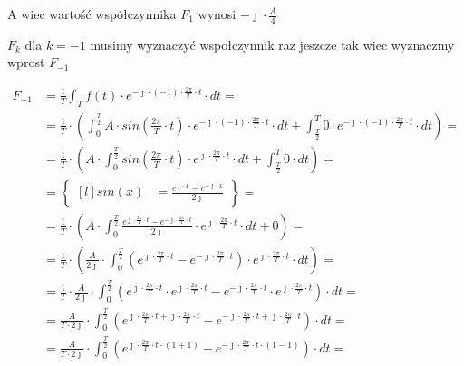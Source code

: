 \begin{task}
A wiec wartość współczynnika $F_1$ wynosi $-\jmath \cdot \frac{A}{4}$

$F_k$ dla $k=-1$ musimy wyznaczyć wspołczynnik raz jeszcze tak wiec wyznaczmy wprost $F_{-1}$

\begin{align*}
F_{-1}&=\frac{1}{T}\int_{T}f(t) \cdot e^{-\jmath \cdot (-1) \cdot \frac{2\pi}{T} \cdot t} \cdot dt=\\
&=\frac{1}{T}\cdot\left(\int_{0}^{\frac{T}{2}}A \cdot sin\left( \frac{2\pi}{T} \cdot t\right) \cdot e^{-\jmath \cdot (-1) \cdot \frac{2\pi}{T} \cdot t} \cdot dt+\int_{\frac{T}{2}}^{T} 0 \cdot e^{-\jmath \cdot (-1) \cdot \frac{2\pi}{T} \cdot t} \cdot dt\right)=\\
&=\frac{1}{T}\cdot\left(A \cdot \int_{0}^{\frac{T}{2}}sin\left( \frac{2\pi}{T} \cdot t\right) \cdot e^{\jmath \cdot \frac{2\pi}{T} \cdot t} \cdot dt+\int_{\frac{T}{2}}^{T} 0 \cdot dt\right)=\\
&=\begin{Bmatrix*}[l]
sin\left(x\right)&=\frac{e^{\jmath \cdot x}-e^{-\jmath \cdot x}}{2 \jmath }
\end{Bmatrix*}=\\
&=\frac{1}{T}\cdot\left(A \cdot \int_{0}^{\frac{T}{2}} \frac{e^{\jmath \cdot \frac{2\pi}{T} \cdot t}-e^{-\jmath \cdot \frac{2\pi}{T} \cdot t}}{2\jmath} \cdot e^{\jmath \cdot \frac{2\pi}{T} \cdot t} \cdot dt+0\right)=\\
&=\frac{1}{T}\cdot\left(\frac{A}{2\jmath} \cdot \int_{0}^{\frac{T}{2}} \left(e^{\jmath \cdot \frac{2\pi}{T} \cdot t}-e^{-\jmath \cdot \frac{2\pi}{T} \cdot t}\right)\cdot e^{\jmath \cdot \frac{2\pi}{T} \cdot t} \cdot dt\right)=\\
&=\frac{1}{T} \cdot \frac{A}{2\jmath} \cdot \int_{0}^{\frac{T}{2}}
\left( e^{\jmath \cdot \frac{2\pi}{T} \cdot t} \cdot e^{\jmath \cdot \frac{2\pi}{T} \cdot t} - e^{-\jmath \cdot \frac{2\pi}{T} \cdot t} \cdot e^{\jmath \cdot \frac{2\pi}{T} \cdot t} \right) \cdot dt=\\
&=\frac{A}{T\cdot 2\jmath} \cdot \int_{0}^{\frac{T}{2}}
\left(e^{\jmath \cdot \frac{2\pi}{T} \cdot t +\jmath \cdot \frac{2\pi}{T} \cdot t} - e^{-\jmath \cdot \frac{2\pi}{T} \cdot t +\jmath \cdot \frac{2\pi}{T} \cdot t} \right) \cdot dt=\\
&=\frac{A}{T\cdot 2\jmath} \cdot \int_{0}^{\frac{T}{2}}
\left(e^{\jmath \cdot \frac{2\pi}{T} \cdot t \cdot \left(1 + 1\right)} - e^{-\jmath \cdot \frac{2\pi}{T} \cdot t \cdot \left(1-1\right)} \right) \cdot dt=\\

\end{align*}
\end{task}
